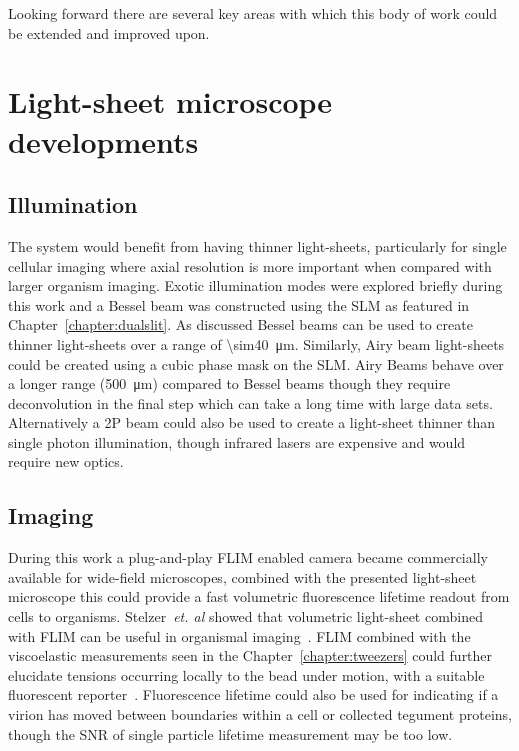 Looking forward there are several key areas with which this body of work could be extended and improved upon.

\section{Light-sheet microscope developments}
\subsection{Illumination}

The system would benefit from having thinner light-sheets, particularly for single cellular imaging where axial resolution is more important when compared with larger organism imaging.
Exotic illumination modes were explored briefly during this work and a Bessel beam was constructed using the \gls{SLM} as featured in Chapter~\ref{chapter:dualslit}.
As discussed Bessel beams can be used to create thinner light-sheets over a range of \SI{\sim40}{\micro\meter}.
Similarly, Airy beam light-sheets could be created using a cubic phase mask on the \gls{SLM}.
Airy Beams behave over a longer range (\SI{500}{\micro\meter}) compared to Bessel beams though they require deconvolution in the final step which can take a long time with large data sets.
Alternatively a \gls{2P} beam could also be used to create a light-sheet thinner than single photon illumination, though infrared lasers are expensive and would require new optics.

\subsection{Imaging}

During this work a plug-and-play \gls{FLIM} enabled camera became commercially available for wide-field microscopes, combined with the presented light-sheet microscope this could provide a fast volumetric fluorescence lifetime readout from cells to organisms.
Stelzer~\emph{et. al} showed that volumetric light-sheet combined with FLIM can be useful in organismal imaging~\cite{gregerThreedimensionalFluorescenceLifetime2011a}.
FLIM combined with the viscoelastic measurements seen in the Chapter~\ref{chapter:tweezers} could further elucidate tensions occurring locally to the bead under motion, with a suitable fluorescent reporter~\cite{colomFluorescentMembraneTension2018}.
Fluorescence lifetime could also be used for indicating if a virion has moved between boundaries within a cell or collected tegument proteins, though the \gls{SNR} of single particle lifetime measurement may be too low.

